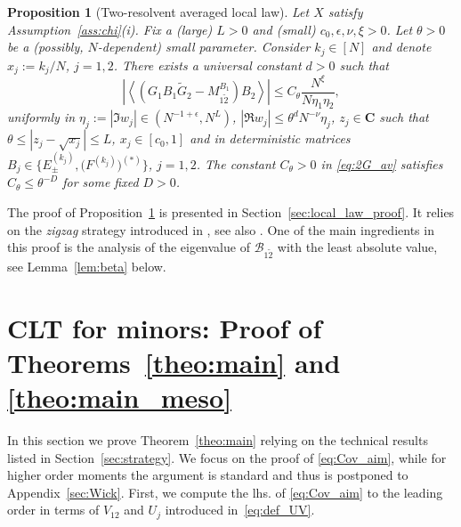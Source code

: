 \documentclass[10pt]{amsart}
\newtheorem{proposition}[theorem]{Proposition}
\numberwithin{equation}{section}
\newcommand{\C}{\mathbf{C}}
\begin{document}
\begin{proposition}[Two-resolvent averaged local law]\label{prop:2G_randomD} Let $X$ satisfy Assumption~\ref{ass:chi}(i).  Fix a (large) $L>0$ and (small) $c_0,\epsilon,\nu,\xi>0$. Let $\theta>0$ be a (possibly, $N$-dependent) small parameter.  Consider $k_j\in[N]$ and denote $x_j:=k_j/N$, $j=1,2$. There exists a universal constant $d>0$ such that
\begin{equation}
\left\vert\left\langle \left(G_1B_1\widetilde{G}_2 - M_{1\widetilde{2}}^{B_1}\right)B_2\right\rangle\right\vert \le C_\theta \frac{N^\xi}{N\eta_1\eta_2},
\label{eq:2G_av}
\end{equation}
uniformly in $\eta_j:=|\Im w_j|\in (N^{-1+\epsilon}, N^L)$, $|\Re w_j|\le \theta^d N^{-\nu}\eta_j$, $z_j\in \C$ such that $\theta\le|z_j-\sqrt{x_j}|\le L$, $x_j\in [c_0,1]$ and in deterministic matrices $B_j\in \{E_\pm^{(k_j)},\big(F^{(k_j)}\big)^{(*)}\}$, $j=1,2$. The constant $C_\theta>0$ in \eqref{eq:2G_av} satisfies $C_\theta\le \theta^{-D}$ for some fixed $D>0$.
\end{proposition}

The proof of Proposition~\ref{prop:2G_randomD} is presented in Section~\ref{sec:local_law_proof}. It relies on the \emph{zigzag} strategy introduced in \cite{cipolloni2024out}, see also \cite{Cipolloni_meso, cipolloni2023eigenstate}. One of the main ingredients in this proof is the analysis of the eigenvalue of $\mathcal{B}_{1\widetilde{2}}$ with the least absolute value, see Lemma~\ref{lem:beta} below. 

\section{CLT for minors: Proof of Theorems~\ref{theo:main} and \ref{theo:main_meso}}
\label{sec:CLTproofs}

In this section we prove Theorem~\ref{theo:main} relying on the technical results listed in Section~\ref{sec:strategy}. We focus on the proof of \eqref{eq:Cov_aim}, while for higher order moments the argument is standard and thus is postponed to Appendix~\ref{sec:Wick}. First, we compute the lhs. of \eqref{eq:Cov_aim} to the leading order in terms of $V_{12}$ and $U_j$ introduced in~\eqref{eq:def_UV}.
\end{document}
